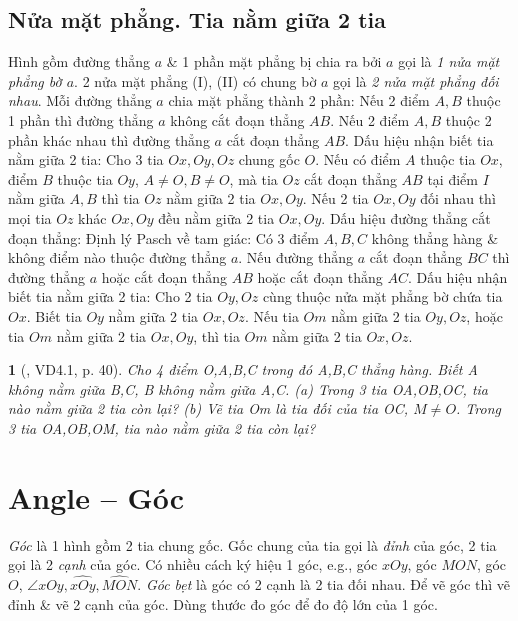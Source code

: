 \documentclass{article}
\newtheorem{baitoan}{}
\begin{document}
\subsection{Nửa mặt phẳng. Tia nằm giữa 2 tia}
 Hình gồm đường thẳng $a$ \& 1 phần mặt phẳng bị chia ra bởi $a$ gọi là \textit{1 nửa mặt phẳng bờ $a$}. 2 nửa mặt phẳng (I), (II) có chung bờ $a$ gọi là \textit{2 nửa mặt phẳng đối nhau}.  Mỗi đường thẳng $a$ chia mặt phẳng thành 2 phần: Nếu 2 điểm $A,B$ thuộc 1 phần thì đường thẳng $a$ không cắt đoạn thẳng $AB$. Nếu 2 điểm $A,B$ thuộc 2 phần khác nhau thì đường thẳng $a$ cắt đoạn thẳng $AB$.  {\sf Dấu hiệu nhận biết tia nằm giữa 2 tia}: Cho 3 tia $Ox,Oy,Oz$ chung gốc $O$. Nếu có điểm $A$ thuộc tia $Ox$, điểm $B$ thuộc tia $Oy$, $A\ne O,B\ne O$, mà tia $Oz$ cắt đoạn thẳng $AB$ tại điểm $I$ nằm giữa $A,B$ thì tia $Oz$ nằm giữa 2 tia $Ox,Oy$.  Nếu 2 tia $Ox,Oy$ đối nhau thì mọi tia $Oz$ khác $Ox,Oy$ đều nằm giữa 2 tia $Ox,Oy$.  {\sf Dấu hiệu đường thẳng cắt đoạn thẳng}: {\sc Định lý Pasch về tam giác}: Có 3 điểm $A,B,C$ không thẳng hàng \& không điểm nào thuộc đường thẳng $a$. Nếu đường thẳng $a$ cắt đoạn thẳng $BC$ thì đường thẳng $a$ hoặc cắt đoạn thẳng $AB$ hoặc cắt đoạn thẳng $AC$.  {\sf Dấu hiệu nhận biết tia nằm giữa 2 tia}: Cho 2 tia $Oy,Oz$ cùng thuộc nửa mặt phẳng bờ chứa tia $Ox$. Biết tia $Oy$ nằm giữa 2 tia $Ox,Oz$. Nếu tia $Om$ nằm giữa 2 tia $Oy,Oz$, hoặc tia $Om$ nằm giữa 2 tia $Ox,Oy$, thì tia $Om$ nằm giữa 2 tia $Ox,Oz$.

\begin{baitoan}[\cite{TLCT_THCS_Toan_6_hinh_hoc}, VD4.1, p. 40]
	Cho 4 điểm O,A,B,C trong đó A,B,C thẳng hàng. Biết A không nằm giữa B,C, B không nằm giữa A,C. (a) Trong 3 tia OA,OB,OC, tia nào nằm giữa 2 tia còn lại? (b) Vẽ tia Om là tia đối của tia OC, $M\ne O$. Trong 3 tia OA,OB,OM, tia nào nằm giữa 2 tia còn lại?
\end{baitoan}


\section{Angle -- Góc}
 \textit{Góc} là 1 hình gồm 2 tia chung gốc. Gốc chung của tia gọi là \textit{đỉnh} của góc, 2 tia gọi là 2 \textit{cạnh} của góc. Có nhiều cách ký hiệu 1 góc, e.g., góc $xOy$, góc $MON$, góc $O$, $\angle xOy,\widehat{xOy},\widehat{MON}$.  \textit{Góc bẹt} là góc có 2 cạnh là 2 tia đối nhau.  Để vẽ góc thì vẽ đỉnh \& vẽ 2 cạnh của góc. Dùng thước đo góc để đo độ lớn của 1 góc.
\end{document}
